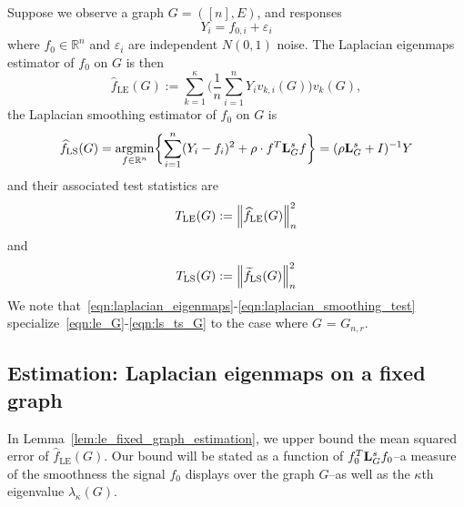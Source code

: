 \documentclass{article}
\newcommand{\Reals}{\mathbb{R}}
\newcommand{\1}{\mathbf{1}}
\DeclareMathOperator*{\argmin}{argmin}
\newcommand{\Lap}{{\bf L}}
\newcommand{\wt}[1]{\widetilde{#1}}
\newcommand{\wh}[1]{\widehat{#1}}
\newcommand{\LE}{\mathrm{LE}}
\newcommand{\LS}{\mathrm{LS}}
\theoremstyle{alden}
\theoremstyle{aldenthm}
\theoremstyle{definition}
\theoremstyle{remark}
\begin{document}
Suppose we observe a graph $G = ([n],E)$, and responses
\begin{equation}
\label{eqn:fixed_graph_regression_model}
Y_i = f_{0,i} + \varepsilon_i
\end{equation}
where $f_0 \in \Reals^n$ and $\varepsilon_i$ are independent $N(0,1)$ noise. The Laplacian eigenmaps estimator of $f_0$ on $G$ is then
\begin{equation}
\label{eqn:le_G}
\wh{f}_{\LE}(G) := \sum_{k = 1}^{\kappa} \biggl(\frac{1}{n}\sum_{i = 1}^{n} Y_i v_{k,i}(G) \biggr) v_k(G),
\end{equation}
the Laplacian smoothing estimator of $f_0$ on $G$ is
\begin{equation}
\label{eqn:ls_G}
\wh{f}_{\LS}(G) = \argmin_{f \in \Reals^n} \biggl\{ \sum_{i = 1}^{n}(Y_i - f_i)^2 + \rho \cdot f^T \Lap_G^{s}  f \biggr\} = (\rho \Lap_G^s + I)^{-1}Y
\end{equation}
and their associated test statistics are
\begin{equation}
\label{eqn:le_ts_G}
T_{\LE}(G) := \Bigl\|\wh{f}_{\LE}(G)\Bigr\|_n^2
\end{equation}
and
\begin{equation}
\label{eqn:ls_ts_G}
T_{\LS}(G) := \Bigl\|\wt{f}_{\LS}(G)\Bigr\|_n^2
\end{equation}
We note that~\eqref{eqn:laplacian_eigenmaps}-\eqref{eqn:laplacian_smoothing_test} specialize~\eqref{eqn:le_G}-\eqref{eqn:ls_ts_G} to the case where $G$ = $G_{n,r}$.

\subsection{Estimation: Laplacian eigenmaps on a fixed graph}

In Lemma~\ref{lem:le_fixed_graph_estimation}, we upper bound the mean squared error of $\wh{f}_{\LE}(G)$. Our bound will be stated as a function of $f_0^T \Lap_G^s f_0$--a measure of the smoothness the signal $f_0$ displays over the graph $G$--as well as the $\kappa$th eigenvalue $\lambda_{\kappa}(G)$.
\end{document}
